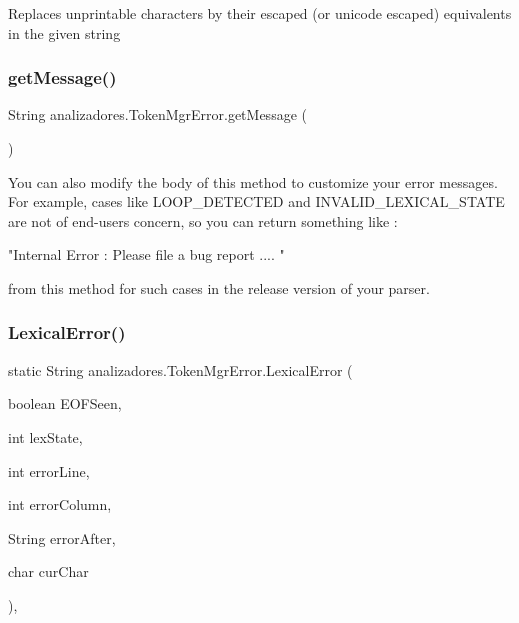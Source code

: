Replaces unprintable characters by their escaped (or unicode escaped) equivalents in the given string \mbox{\label{classanalizadores_1_1_token_mgr_error_a2ca09b102b2298a30e610bff62937adb}} 
\subsubsection{\texorpdfstring{get\+Message()}{getMessage()}}
{\footnotesize\ttfamily String analizadores.\+Token\+Mgr\+Error.\+get\+Message (\begin{DoxyParamCaption}{ }\end{DoxyParamCaption})}

You can also modify the body of this method to customize your error messages. For example, cases like L\+O\+O\+P\+\_\+\+D\+E\+T\+E\+C\+T\+ED and I\+N\+V\+A\+L\+I\+D\+\_\+\+L\+E\+X\+I\+C\+A\+L\+\_\+\+S\+T\+A\+TE are not of end-\/users concern, so you can return something like \+: \begin{DoxyVerb}"Internal Error : Please file a bug report .... "
\end{DoxyVerb}


from this method for such cases in the release version of your parser. \mbox{\label{classanalizadores_1_1_token_mgr_error_a4d3448e37bf6a5bcff202bd569fe0410}} 
\subsubsection{\texorpdfstring{Lexical\+Error()}{LexicalError()}}
{\footnotesize\ttfamily static String analizadores.\+Token\+Mgr\+Error.\+Lexical\+Error (\begin{DoxyParamCaption}\item[{boolean}]{E\+O\+F\+Seen,  }\item[{int}]{lex\+State,  }\item[{int}]{error\+Line,  }\item[{int}]{error\+Column,  }\item[{String}]{error\+After,  }\item[{char}]{cur\+Char }\end{DoxyParamCaption})\hspace{0.3cm}{\ttfamily [static]}, {\ttfamily [protected]}}


